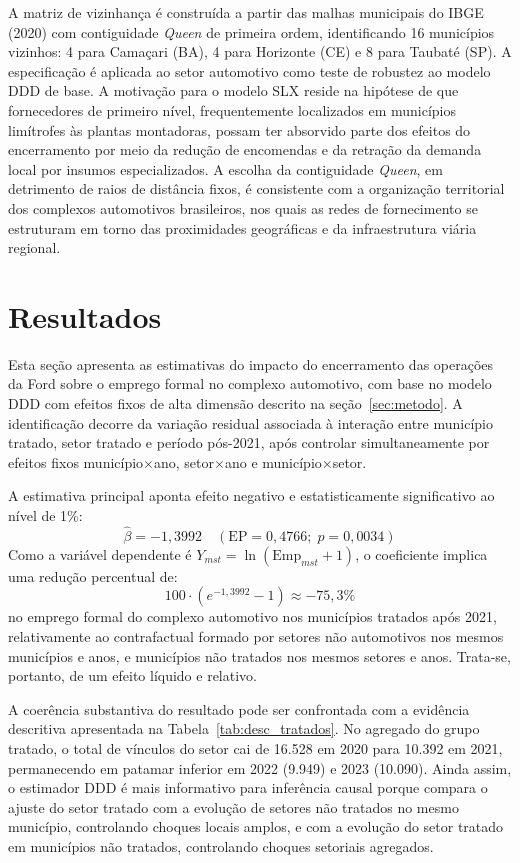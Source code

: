 \documentclass[12pt,a4paper]{article}
\begin{document}
A matriz de vizinhan\c{c}a \'e constru\'ida a partir das malhas municipais do IBGE (2020) com contiguidade \textit{Queen} de primeira ordem, identificando 16 munic\'ipios vizinhos: 4 para Cama\c{c}ari (BA), 4 para Horizonte (CE) e 8 para Taubat\'e (SP). A especifica\c{c}\~ao \'e aplicada ao setor automotivo como teste de robustez ao modelo DDD de base. A motiva\c{c}\~ao para o modelo SLX reside na hip\'otese de que fornecedores de primeiro n\'ivel, frequentemente localizados em munic\'ipios lim\'itrofes \`as plantas montadoras, possam ter absorvido parte dos efeitos do encerramento por meio da redu\c{c}\~ao de encomendas e da retra\c{c}\~ao da demanda local por insumos especializados. A escolha da contiguidade \textit{Queen}, em detrimento de raios de dist\^ancia fixos, \'e consistente com a organiza\c{c}\~ao territorial dos complexos automotivos brasileiros, nos quais as redes de fornecimento se estruturam em torno das proximidades geogr\'aficas e da infraestrutura vi\'aria regional.

\section{Resultados}
\label{sec:resultados}

Esta se\c{c}\~ao apresenta as estimativas do impacto do encerramento das opera\c{c}\~oes da Ford sobre o emprego formal no complexo automotivo, com base no modelo DDD com efeitos fixos de alta dimens\~ao descrito na se\c{c}\~ao~\ref{sec:metodo}. A identifica\c{c}\~ao decorre da varia\c{c}\~ao residual associada \`a intera\c{c}\~ao entre munic\'ipio tratado, setor tratado e per\'iodo p\'os-2021, ap\'os controlar simultaneamente por efeitos fixos munic\'ipio$\times$ano, setor$\times$ano e munic\'ipio$\times$setor.

A estimativa principal aponta efeito negativo e estatisticamente significativo ao n\'ivel de 1\%:
\[
\hat{\beta} = -1{,}3992 \quad (\text{EP} = 0{,}4766;\; p = 0{,}0034)
\]
Como a vari\'avel dependente \'e $Y_{mst} = \ln(\text{Emp}_{mst} + 1)$, o coeficiente implica uma redu\c{c}\~ao percentual de:
\[
100 \cdot (e^{-1{,}3992} - 1) \approx -75{,}3\%
\]
no emprego formal do complexo automotivo nos munic\'ipios tratados ap\'os 2021, relativamente ao contrafactual formado por setores n\~ao automotivos nos mesmos munic\'ipios e anos, e munic\'ipios n\~ao tratados nos mesmos setores e anos. Trata-se, portanto, de um efeito l\'iquido e relativo.

A coer\^encia substantiva do resultado pode ser confrontada com a evid\^encia descritiva apresentada na Tabela~\ref{tab:desc_tratados}. No agregado do grupo tratado, o total de v\'inculos do setor cai de 16.528 em 2020 para 10.392 em 2021, permanecendo em patamar inferior em 2022 (9.949) e 2023 (10.090). Ainda assim, o estimador DDD \'e mais informativo para infer\^encia causal porque compara o ajuste do setor tratado com a evolu\c{c}\~ao de setores n\~ao tratados no mesmo munic\'ipio, controlando choques locais amplos, e com a evolu\c{c}\~ao do setor tratado em munic\'ipios n\~ao tratados, controlando choques setoriais agregados.
\end{document}
